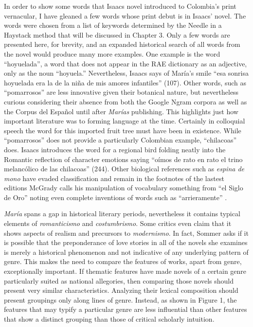 \documentclass[12pt]{report}\usepackage[]{graphicx}\usepackage[]{color}
\begin{document}
\begin{spacing}{1.9}
In order to show some words that Isaacs novel introduced to Colombia's print vernacular, I have gleaned a few words whose print debut is in Isaacs’ novel.
The words were chosen from a list of keywords determined by the Needle in a Haystack method that will be discussed in Chapter 3.
Only a few words are presented here, for brevity, and an expanded historical search of all words from the novel would produce many more examples.
One example is the word \enquote{hoyuelada}, a word that does not appear in the RAE dictionary as an adjective, only as the noun \enquote{hoyuela.}
Nevertheless, Isaacs says of María’s smile \enquote{esa sonrisa hoyuelada era la de la niña de mis amores infantiles} (107).
Other words, such as \enquote{pomarrosos} are less innovative given their botanical nature, but nevertheless curious considering their absence from both the Google Ngram corpora as well as the Corpus del Español until after \textit{Marías} publishing.
This highlights just how important literature was to forming language at the time.
Certainly in colloquial speech the word for this imported fruit tree must have been in existence.
While \enquote{pomarrosos} does not provide a particularly Colombian example, \enquote{chilacoas} does.
Isaacs introduces the word for a regional bird folding neatly into the Romantic reflection of character emotions saying \enquote{oímos de rato en rato el trino melancólico de las chilacoas} (244).
Other biological references such as \textit{espina de mono} have evaded classification and remain in the footnotes of the lastest editions
McGrady calls his manipulation of vocabulary something from \enquote{el Siglo de Oro} noting even complete inventions of words such as \enquote{arrieramente} \autocite[43]{McGrady2012}.

\textit{María} spans a gap in historical literary periods, nevertheless it contains typical elements of \textit{romanticismo} and \textit{costumbrismo}.
Some critics even claim that it shows aspects of realism and precursors to \textit{modernismo}.
In fact, Sommer asks if it is possible that the preponderance of love stories in all of the novels she examines is merely a historical phenomenon and not indicative of any underlying pattern of genre.
This makes the need to compare the features of works, apart from genre, exceptionally important.
If thematic features have made novels of a certain genre particularly suited as national allegories, then comparing those novels should present very similar characteristics.
Analyzing their lexical composition should present groupings only along lines of genre.
Instead, as shown in Figure 1, the features that may typify a particular genre are less influential than other features that show a distinct grouping than those of critical scholarly intuition.



\end{spacing}
\end{document}

